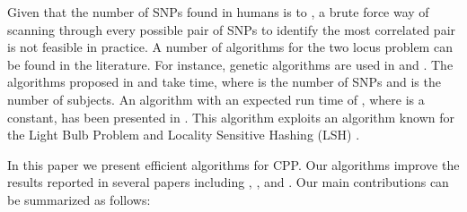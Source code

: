 \documentclass{article}
\theoremstyle{definition}
\theoremstyle{remark}
\begin{document}
Given that the number of SNPs found in humans is  to , a brute force way of scanning through every possible pair of SNPs to identify the most correlated pair is not feasible in practice. A number of algorithms for the two locus problem can be found in the literature. For instance, genetic algorithms are used in \cite{NYH01} and \cite{YXKR10}. The algorithms proposed in  \cite{XSFW10} and \cite{XFW08} take  time, where  is the number of SNPs and  is the number of subjects. An algorithm with an expected run time of , where  is a constant, has been presented in \cite{PBK11}. This algorithm exploits an algorithm known for the  Light Bulb Problem \cite{RSJ89} and Locality Sensitive Hashing (LSH) \cite{M02}.

In this paper we present efficient algorithms for CPP. Our algorithms improve the results reported in several papers including \cite{AEQSB09}, \cite{BES03}, and  \cite{PBK11}. Our main contributions can be summarized as follows:
\end{document}
